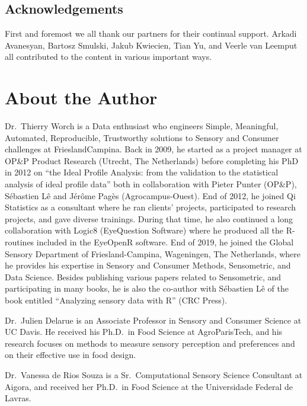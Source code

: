 \documentclass[
]{krantz}
\begin{document}
\hypertarget{acknowledgements}{%
\section*{Acknowledgements}\label{acknowledgements}}


First and foremost we all thank our partners for their continual support. Arkadi Avanesyan, Bartosz Smulski, Jakub Kwiecien, Tian Yu, and Veerle van Leemput all contributed to the content in various important ways.

\hypertarget{about-the-author}{%
\chapter*{About the Author}\label{about-the-author}}


Dr.~Thierry Worch is a Data enthusiast who engineers Simple, Meaningful, Automated, Reproducible, Trustworthy solutions to Sensory and Consumer challenges at FrieslandCampina.
Back in 2009, he started as a project manager at OP\&P Product Research (Utrecht, The Netherlands) before completing his PhD in 2012 on ``the Ideal Profile Analysis: from the validation to the statistical analysis of ideal profile data'' both in collaboration with Pieter Punter (OP\&P), Sébastien Lê and Jérôme Pagès (Agrocampus-Ouest). End of 2012, he joined Qi Statistics as a consultant where he ran clients' projects, participated to research projects, and gave diverse trainings. During that time, he also continued a long collaboration with Logic8 (EyeQuestion Software) where he produced all the R-routines included in the EyeOpenR software. End of 2019, he joined the Global Sensory Department of Friesland-Campina, Wageningen, The Netherlands, where he provides his expertise in Sensory and Consumer Methods, Sensometric, and Data Science.
Besides publishing various papers related to Sensometric, and participating in many books, he is also the co-author with Sébastien Lê of the book entitled ``Analyzing sensory data with R'' (CRC Press).

Dr.~Julien Delarue is an Associate Professor in Sensory and Consumer Science at UC Davis. He received his Ph.D.~in Food Science at AgroParisTech, and his research focuses on methods to measure sensory perception and preferences and on their effective use in food design.

Dr.~Vanessa de Rios Souza is a Sr.~Computational Sensory Science Consultant at Aigora, and received her Ph.D.~in Food Science at the Universidade Federal de Lavras.
\end{document}
